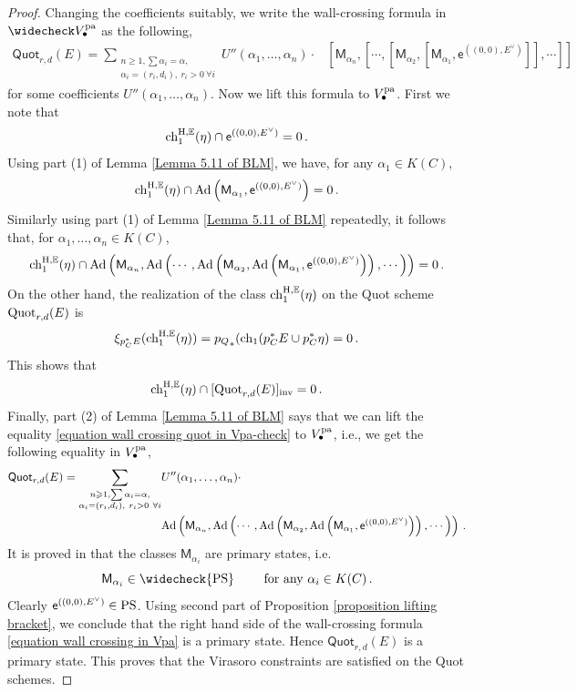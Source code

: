 \documentclass[11pt]{amsart}
\theoremstyle{remark}
\newcommand{\ch}{{\rm ch}}
\newcommand{\E}{\mathbb{E}}
\newcommand{\quot}[0]{\textnormal{Quot}}
\newcommand{\inv}[0]{\textnormal{inv}}
\newcommand{\pa}[0]{\textnormal{pa}}
\newcommand{\chhE}[0]{\textnormal{ch}^{\textnormal{H},\E}}
\newcommand{\ad}[0]{\textnormal{Ad}}
\newcommand{\sfM}{\mathsf M}
\newcommand{\PS}{\textnormal{PS}}
\numberwithin{theorem}{section}
\begin{document}
\begin{proof}
    Changing the coefficients suitably, we write the wall-crossing formula in $\widecheck V^\pa_\bullet$ as the following,
    \begin{align}\label{equation wall crossing quot in Vpa-check}
    \mathsf{Quot}_{r,d}(E)
            =\sum_{\substack{n\geqslant 1, \sum \alpha_i = \alpha, \\ 
            \alpha_i=(r_i,d_i),\ r_i>0 \ \forall i}}
            U''(\alpha_1,\dots,\alpha_n) \cdot
            & \left[ \sfM_{\alpha_n},
            \left[ \cdots, \left[ \sfM_{\alpha_2}, \left[\sfM_{\alpha_1}, \mathsf e^{((0,0),E^\vee)} \right] \right], \cdots \right] \right]
    \end{align}
    for some coefficients $U''(\alpha_1,\dots,\alpha_n)$.
    Now we lift this formula to $V^\pa_\bullet$.
    First we note that 
    $$\chhE_1(\eta) \cap \mathsf e^{((0,0),E^\vee)}=0\,.$$
    Using part (1) of Lemma \ref{Lemma 5.11 of BLM}, we have,
    for any $\alpha_1 \in K(C)$,
    $$\chhE_1(\eta) \cap \ad \left( \sfM_{\alpha_1}, \mathsf e^{((0,0),E^\vee)} \right)=0\,.$$
    Similarly using part (1) of Lemma \ref{Lemma 5.11 of BLM} repeatedly, it follows that,
    for $\alpha_1,\dots,\alpha_n \in K(C)$,
    $$\chhE_1(\eta) \cap \ad \left( \sfM_{\alpha_n},
            \ad \left( \cdots, \ad \left( \sfM_{\alpha_2}, \ad \left(\sfM_{\alpha_1}, \mathsf e^{((0,0),E^\vee)} \right) \right), \cdots \right) \right)=0\,.$$
    On the other hand, the realization of the class $\chhE_1(\eta)$ on the Quot scheme $\quot_{r,d}(E)$ is 
    $$\xi_{p_C^*E}(\chhE_1(\eta)) = {p_Q}_*(\ch_1(p_C^*E \cup p_C^*\eta) = 0\,.$$
    This shows that $$ \chhE_1(\eta) \cap [\quot_{r,d}(E)]_\inv=0\,.$$
    Finally, part (2) of Lemma \ref{Lemma 5.11 of BLM}
    says that we can lift the equality \eqref{equation wall crossing quot in Vpa-check} to $V^\pa_\bullet$,
    i.e., we get the following equality in $V^\pa_\bullet$,
    \begin{align}\label{equation wall crossing in Vpa}
    \nonumber
    \mathsf{Quot}_{r,d}(E)
            =\sum_{\substack{n\geqslant 1, \sum \alpha_i = \alpha, \\ 
            \alpha_i=(r_i,d_i),\ r_i>0 \ \forall i}}
            &U''(\alpha_1,\dots,\alpha_n) \cdot \\
            &\ad \left( \sfM_{\alpha_n},
            \ad \left( \cdots, \ad \left( \sfM_{\alpha_2}, \ad \left(\sfM_{\alpha_1}, \mathsf e^{((0,0),E^\vee)} \right) \right), \cdots \right) \right)\,.
    \end{align}
    It is proved in \cite[Theorem 5.12]{BLM24} that 
    the classes $\sfM_{\alpha_i}$ are primary states, i.e.
    $$ \sfM_{\alpha_i} \in \widecheck{\PS} 
    \qquad \text{ for any } \alpha_i \in K(C)
    \,.$$
    Clearly $\mathsf e^{((0,0),E^\vee)} \in \PS$.
    Using second part of Proposition \ref{proposition lifting bracket}, 
    we conclude that the right hand side of the wall-crossing formula \eqref{equation wall crossing in Vpa} 
    is a primary state.
    Hence $\mathsf{Quot}_{r,d}(E)$ is a  primary state.
    This proves that the Virasoro constraints are satisfied on the Quot schemes.
\end{proof}
\end{document}
